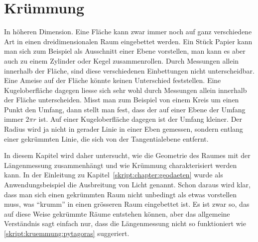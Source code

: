 %
%
%
\chapter{Krümmung\label{skript:chapter:kruemmung}}
\rhead{}

In höheren Dimension.
Eine Fläche kann zwar immer noch auf ganz verschiedene Art in
einen dreidimensionalen Raum eingebettet werden.
Ein Stück Papier kann man sich zum Beispiel als Ausschnitt einer
Ebene vorstellen, man kann es aber auch zu einem Zylinder oder
Kegel zusammenrollen.
Durch Messungen allein innerhalb der Fläche, sind diese verschiedenen
Einbettungen nicht unterscheidbar.
Eine Ameise auf der Fläche könnte keinen Unterschied feststellen.
Eine Kugeloberfläche dagegen liesse sich sehr wohl durch Messungen
allein innerhalb der Fläche unterscheiden.
Misst man zum Beispiel von einem Kreis um einen Punkt den Umfang,
dann stellt man fest, dass der auf einer Ebene der Umfang immer $2\pi r$ ist.
Auf einer Kugeloberfläche dagegen ist der Umfang kleiner.
Der Radius wird ja nicht in gerader Linie in einer Eben gemessen,
sondern entlang einer gekrümmten Linie, die sich von der Tangentialebene
entfernt.

In diesem Kapitel wird daher untersucht, wie die Geometrie des Raumes
mit der Längenmessung zusammenhängt und wie Krümmung charakterisiert
werden kann.
In der Einleitung zu Kapitel~\ref{skript:chapter:geodaeten} wurde
als Anwendungsbeispiel die Ausbreitung von Licht genannt.
Schon daraus wird klar, dass man sich einen gekrümmten
Raum nicht unbedingt als etwas vorstellen muss, was ``krumm'' in einen
grösseren Raum eingebettet ist. 
Es ist zwar so, das auf diese Weise gekrümmte Räume entstehen können,
aber das allgemeine Verständnis sagt einfach nur, dass die Längenmessung
nicht so funktioniert wie \eqref{skript:kruemmung:pytagoras} suggeriert.




